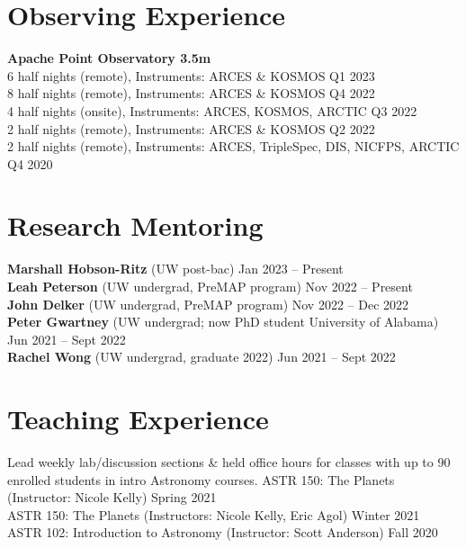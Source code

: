 \documentclass[a4,10.5pt]{article}
\begin{document}
\section{Observing Experience}
\textbf{Apache Point Observatory 3.5m}  \\
6 half nights (remote), Instruments: ARCES \& KOSMOS \hfill Q1 2023 \\
8 half nights (remote), Instruments: ARCES \& KOSMOS \hfill Q4 2022 \\
4 half nights (onsite), Instruments: ARCES, KOSMOS, ARCTIC \hfill Q3 2022 \\
2 half nights (remote), Instruments: ARCES \& KOSMOS \hfill Q2 2022 \\
2 half nights (remote), Instruments: ARCES, TripleSpec, DIS, NICFPS, ARCTIC \hfill Q4 2020


\section{Research Mentoring}

\textbf{Marshall Hobson-Ritz} (UW post-bac) \hfill Jan 2023 -- Present \\
\textbf{Leah Peterson} (UW undergrad, PreMAP program) \hfill Nov 2022 -- Present \\
\textbf{John Delker} (UW undergrad, PreMAP program) \hfill Nov 2022 -- Dec 2022 \\
\textbf{Peter Gwartney} (UW undergrad; now PhD student University of Alabama) \hfill Jun 2021 -- Sept 2022 \\
\textbf{Rachel Wong} (UW undergrad, graduate 2022) \hfill Jun 2021 -- Sept 2022 


\section{Teaching Experience}

Lead weekly lab/discussion sections \& held office hours for classes with up to 90 enrolled students in intro Astronomy courses. \vspace{.1cm} \newline
ASTR 150: The Planets (Instructor: Nicole Kelly) \hfill Spring 2021  \\
ASTR 150: The Planets (Instructors: Nicole Kelly, Eric Agol) \hfill Winter 2021  \\
ASTR 102: Introduction to Astronomy (Instructor: Scott Anderson) \hfill Fall 2020 
\end{document}
